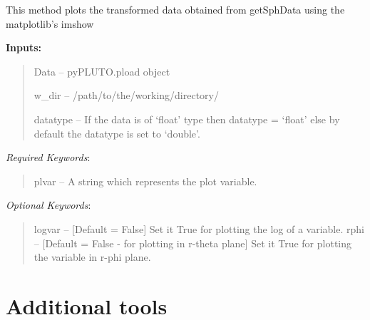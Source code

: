 \documentclass[letterpaper,10pt,english]{sphinxmanual}
\begin{document}
\begin{fulllineitems}
\begin{fulllineitems}
\begin{quote}






\end{quote}

\end{fulllineitems}


\begin{fulllineitems}
\label{image:pyPLUTO.Image.pltSphData}
This method plots the transformed data obtained from getSphData using the matplotlib's imshow

\textbf{Inputs:}
\begin{quote}

Data -- pyPLUTO.pload object

w\_dir -- /path/to/the/working/directory/

datatype -- If the data is of `float' type then datatype = `float' else by default the datatype is set to `double'.
\end{quote}

\emph{Required Keywords}:
\begin{quote}

plvar -- A string which represents the plot variable.
\end{quote}

\emph{Optional Keywords}:
\begin{quote}

logvar -- {[}Default = False{]} Set it True for plotting the log of a variable.
rphi -- {[}Default = False - for plotting in r-theta plane{]} Set it True for plotting the variable in r-phi plane.
\end{quote}

\end{fulllineitems}


\end{fulllineitems}



\section{Additional tools}
\label{tools:additional-tools}\label{tools::doc}
\end{document}
